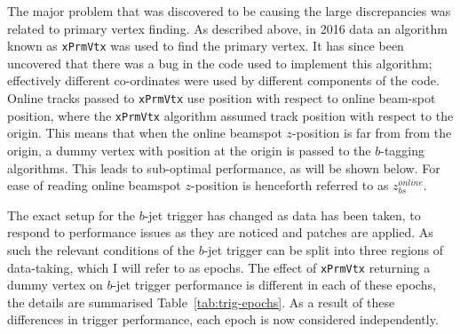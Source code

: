 The major problem that was discovered to be causing the large discrepancies was related to primary vertex finding.
As described above, in 2016 data an algorithm known as \verb|xPrmVtx| was used to find the primary vertex.
It has since been uncovered that there was a bug in the code used to implement this algorithm;
effectively different co-ordinates were used by different components of the code.
Online tracks passed to \verb|xPrmVtx| use position with respect to online beam-spot position,
where the \verb|xPrmVtx| algorithm assumed track position with respect to the origin.
This means that when the online beamspot $z$-position is far from from the origin,
a dummy vertex with position at the origin is passed to the $b$-tagging algorithms.
This leads to sub-optimal performance, as will be shown below.
For ease of reading online beamspot $z$-position is henceforth referred to as $z_{bs}^{online}$.  

The exact setup for the $b$-jet trigger has changed as data has been taken, to respond to performance issues as they are noticed and patches are applied.
As such the relevant conditions of the $b$-jet trigger can be split into three regions of data-taking, which I will refer to as epochs.
The effect of \verb|xPrmVtx| returning a dummy vertex on $b$-jet trigger performance is different in each of these epochs,
the details are summarised Table~\ref{tab:trig-epochs}.
As a result of these differences in trigger performance, each epoch is now considered independently.

